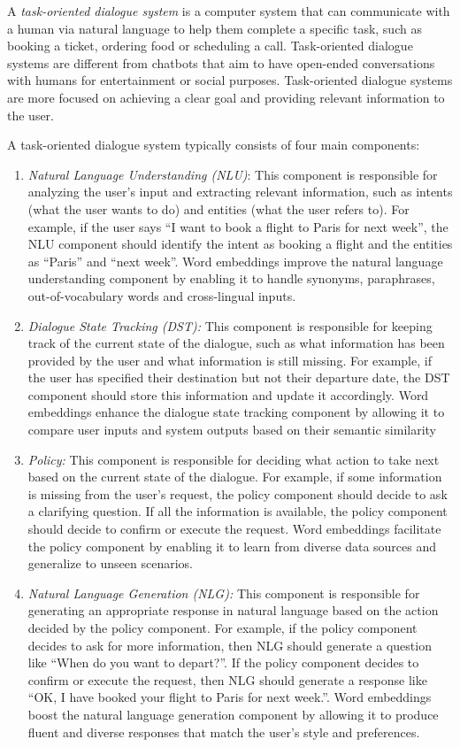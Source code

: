 \documentclass[11pt, a4paper]{amsart}
\begin{document}
A \emph{task-oriented dialogue system} is a computer system that can communicate with a human via natural language to help them complete a specific task, such as booking a ticket, ordering food or scheduling a call.
Task-oriented dialogue systems are different from chatbots that aim to have open-ended conversations with humans for entertainment or social purposes.
Task-oriented dialogue systems are more focused on achieving a clear goal and providing relevant information to the user.

A task-oriented dialogue system typically consists of four main components:

\begin{enumerate}
	\item \emph{Natural Language Understanding (NLU)}:
	This component is responsible for analyzing the user’s input and extracting relevant information, such as intents (what the user wants to do) and entities (what the user refers to).
	For example, if the user says ``I want to book a flight to Paris for next week'', the NLU component should identify the intent as booking a flight and the entities as ``Paris'' and ``next week''.
	Word embeddings improve the natural language understanding component by enabling it to handle synonyms, paraphrases, out-of-vocabulary words and cross-lingual inputs.
	\item \emph{Dialogue State Tracking (DST):}
	This component is responsible for keeping track of the current state of the dialogue, such as what information has been provided by the user and what information is still missing.
	For example, if the user has specified their destination but not their departure date, the DST component should store this information and update it accordingly.
	Word embeddings enhance the dialogue state tracking component by allowing it to compare user inputs and system outputs based on their semantic similarity
	\item \emph{Policy:}
	This component is responsible for deciding what action to take next based on the current state of the dialogue.
	For example, if some information is missing from the user’s request, the policy component should decide to ask a clarifying question.
	If all the information is available, the policy component should decide to confirm or execute the request.
	Word embeddings facilitate the policy component by enabling it to learn from diverse data sources and generalize to unseen scenarios.
	\item \emph{Natural Language Generation (NLG):}
	This component is responsible for generating an appropriate response in natural language based on the action decided by the policy component.
	For example, if the policy component decides to ask for more information, then NLG should generate a question like “When do you want to depart?”.
	If the policy component decides to confirm or execute the request, then NLG should generate a response like “OK, I have booked your flight to Paris for next week.”.
	Word embeddings boost the natural language generation component by allowing it to produce fluent and diverse responses that match the user’s style and preferences.
\end{enumerate}
\end{document}
